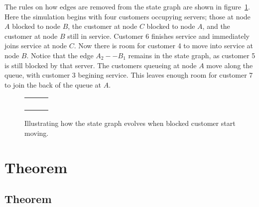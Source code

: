 \documentclass{article}
\begin{document}
The rules on how edges are removed from the state graph are shown in figure~\ref{fig:general_builddown}.
Here the simulation begins with four customers occupying servers; those at node $A$ blocked to node $B$, the customer at node $C$ blocked to node $A$, and the customer at node $B$ still in service.
Customer 6 finishes service and immediately joins service at node $C$.
Now there is room for customer 4 to move into service at node $B$.
Notice that the edge $A_2 -- B_1$ remains in the state graph, as customer 5 is still blocked by that server.
The customers queueing at node $A$ move along the queue, with customer 3 begining service.
This leaves enough room for customer 7 to join the back of the queue at $A$.

\begin{figure}[H]
  \begin{center}
    \begin{tabular}{ c c c }
       & \hspace{0.1\textwidth} &
       \\
       & \hspace{0.1\textwidth} &
       \\
       & \hspace{0.1\textwidth} &
       \\
       & \hspace{0.1\textwidth} &
      
    \end{tabular}
  \end{center}
  \caption{Illustrating how the state graph evolves when blocked customer start moving.}
  \label{fig:general_builddown}
\end{figure}


\section{Theorem}

\subsection*{Theorem}
\end{document}
